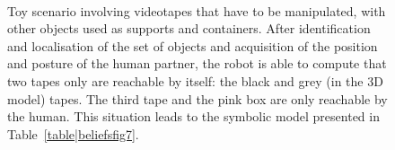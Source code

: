 \documentclass[preprint,3p,times]{elsarticle}
\begin{document}
\begin{figure}[ht!]
   \begin{center}
%
       \\ %
%
   \end{center}

   \caption{Toy scenario involving videotapes that have to be manipulated, with
       other objects used as supports and containers.  After identification and
       localisation of the set of objects and acquisition of the position and
       posture of the human partner, the robot is able to compute that two tapes
       only are reachable by itself: the black and grey (in the 3D model) tapes.
       The third tape and the pink box are only reachable by the human. This
       situation leads to the symbolic model presented in
       Table~\ref{table|beliefsfig7}.  }%
        
 \label{fig:sparkSubfigures}

\end{figure}
\end{document}
